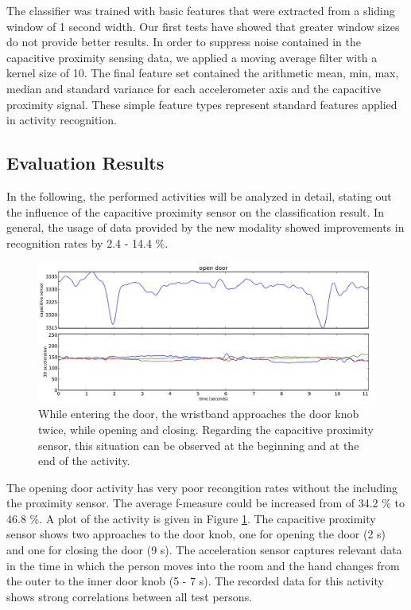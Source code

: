 \documentclass[runningheads,a4paper]{llncs}
\begin{document}
The classifier was trained with basic features that were extracted from a sliding window of 1 second width. Our first tests have showed that greater window sizes do not provide better results. In order to suppress noise contained in the capacitive proximity sensing data, we applied a moving average filter with a kernel size of 10. The final feature set contained the arithmetic mean, min, max, median and standard variance for each accelerometer axis and the capacitive proximity signal. These simple feature types represent standard features applied in activity recognition. 

\subsection{Evaluation Results}

In the following, the performed activities will be analyzed in detail, stating out the influence of the capacitive proximity sensor on the classification result. In general, the usage of data provided by the new modality showed improvements in recognition rates by 2.4 - 14.4 \%.

\begin{figure}
	\centering
		\includegraphics[width=1.00\textwidth]{../Auswertung/images/tobias_1.pdf}
	\caption{While entering the door, the wristband approaches the door knob twice, while opening and closing. Regarding the capacitive proximity sensor, this situation can be observed at the beginning and at the end of the activity.}
	\label{fig:tobias_1}
\end{figure}

The opening door activity has very poor recongition rates without the including the proximity sensor. The average f-measure could be increased from of 34.2 \% to 46.8 \%. A plot of the activity is given in Figure \ref{fig:tobias_1}. The capacitive proximity sensor shows two approaches to the door knob, one for opening the door (2 s) and one for closing the door (9 s). The acceleration sensor captures relevant data in the time in which the person moves into the room and the hand changes from the outer to the inner door knob (5 - 7 s). The recorded data for this activity shows strong correlations between all test persons. 
\end{document}
